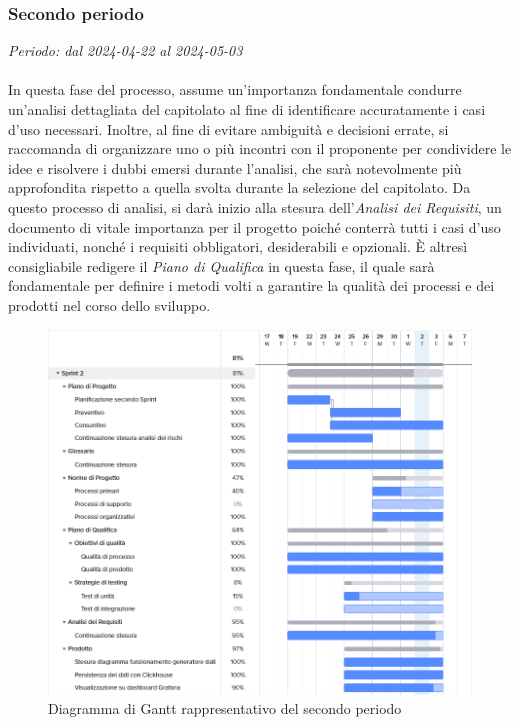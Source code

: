 \subsubsection{Secondo periodo}
\textit{Periodo: dal 2024-04-22 al 2024-05-03}
\\\\
In questa fase del processo, assume un'importanza fondamentale condurre un'analisi dettagliata del capitolato al fine di identificare accuratamente i casi d'uso necessari. Inoltre, al fine di evitare ambiguità e decisioni errate, si raccomanda di organizzare uno o più incontri con il proponente per condividere le idee e risolvere i dubbi emersi durante l'analisi, che sarà notevolmente più approfondita rispetto a quella svolta durante la selezione del capitolato.
Da questo processo di analisi, si darà inizio alla stesura dell'\textit{Analisi dei Requisiti}, un documento di vitale importanza per il progetto poiché conterrà tutti i casi d'uso individuati, nonché i requisiti obbligatori, desiderabili e opzionali.
È altresì consigliabile redigere il \textit{Piano di Qualifica} in questa fase, il quale sarà fondamentale per definire i metodi volti a garantire la qualità dei processi e dei prodotti nel corso dello sviluppo.

\begin{figure}[h]
    \centering
    \includegraphics[width=13cm]{./asset/gantt2.png}
    \caption{Diagramma di Gantt rappresentativo del secondo periodo}
    \label{figure:Diagramma di Gantt rappresentativo del secondo periodo}
\end{figure}

